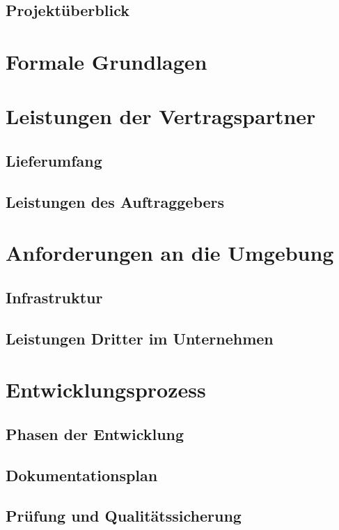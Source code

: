 \documentclass[11pt]{article}
\begin{document}
\subsection{Projektüberblick}

\section{Formale Grundlagen}

\section{Leistungen der Vertragspartner}

\subsection{Lieferumfang}

\subsection{Leistungen des Auftraggebers}

\section{Anforderungen an die Umgebung}

\subsection{Infrastruktur}

\subsection{Leistungen Dritter im Unternehmen}

\section{Entwicklungsprozess}

\subsection{Phasen der Entwicklung}

\subsection{Dokumentationsplan}

\subsection{Prüfung und Qualitätssicherung}
\end{document}
